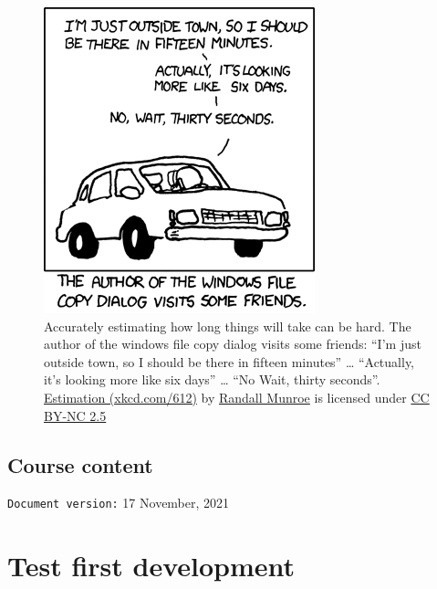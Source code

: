 \documentclass[
]{book}
\begin{document}
\begin{figure}

{\centering \includegraphics[width=0.75\linewidth]{images/xkcd-estimation} 

}

\caption{Accurately estimating how long things will take can be hard. The author of the windows file copy dialog visits some friends: ``I'm just outside town, so I should be there in fifteen minutes'' \ldots{} ``Actually, it's looking more like six days'' \ldots{} ``No Wait, thirty seconds''. \href{https://xkcd.com/612/}{Estimation (xkcd.com/612)} by \href{https://en.wikipedia.org/wiki/Randall_Munroe}{Randall Munroe} is licensed under \href{https://creativecommons.org/licenses/by-nc/2.5/}{CC BY-NC 2.5}}\label{fig:xkcd-estimation-fig}
\end{figure}



\hypertarget{course-content}{%
\section{Course content}\label{course-content}}

\texttt{Document\ version:} 17 November, 2021

\hypertarget{testing}{%
\chapter{Test first development}\label{testing}}
\end{document}
